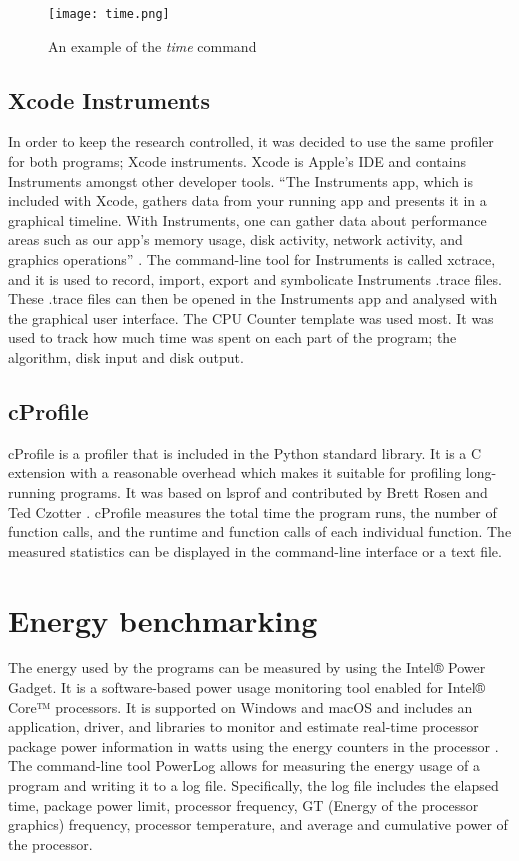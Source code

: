 \begin{figure}[htbp]
	\centering
	\texttt{[image: time.png]}
	\caption{An example of the \textit{time} command}
	\label{figure:time}
\end{figure}

\subsection{Xcode Instruments}
In order to keep the research controlled, it was decided to use the same profiler for both programs; Xcode instruments. Xcode is Apple’s IDE and contains Instruments amongst other developer tools. “The Instruments app, which is included with Xcode, gathers data from your running app and presents it in a graphical timeline. With Instruments, one can gather data about performance areas such as our app’s memory usage, disk activity, network activity, and graphics operations” \cite{instruments}. The command-line tool for Instruments is called xctrace, and it is used to record, import, export and symbolicate Instruments .trace files. These .trace files can then be opened in the Instruments app and analysed with the graphical user interface. The CPU Counter template was used most. It was used to track how much time was spent on each part of the program; the algorithm, disk input and disk output.

\subsection{cProfile}
cProfile is a profiler that is included in the Python standard library. It is a C extension with a reasonable overhead which makes it suitable for profiling long-running programs. It was based on lsprof and contributed by Brett Rosen and Ted Czotter \cite{cprofile}. cProfile measures the total time the program runs, the number of function calls, and the runtime and function calls of each individual function. The measured statistics can be displayed in the command-line interface or a text file.

\section{Energy benchmarking}
The energy used by the programs can be measured by using the Intel® Power Gadget. It is a software-based power usage monitoring tool enabled for Intel® Core™ processors. It is supported on Windows and macOS and includes an application, driver, and libraries to monitor and estimate real-time processor package power information in watts using the energy counters in the processor \cite{powergadget}. The command-line tool PowerLog allows for measuring the energy usage of a program and writing it to a log file. Specifically, the log file includes the elapsed time, package power limit, processor frequency, GT (Energy of the processor graphics) frequency, processor temperature, and average and cumulative power of the processor.

